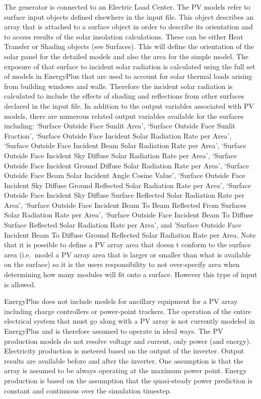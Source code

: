 The generator is connected to an Electric Load Center. The PV models refer to surface input objects defined elsewhere in the input file. This object describes an array that is attached to a surface object in order to describe its orientation and to access results of the solar insolation calculations. These can be either Heat Transfer or Shading objects (see Surfaces). This will define the orientation of the solar panel for the detailed models and also the area for the simple model. The exposure of that surface to incident solar radiation is calculated using the full set of models in EnergyPlus that are used to account for solar thermal loads arising from building windows and walls. Therefore the incident solar radiation is calculated to include the effects of shading and reflections from other surfaces declared in the input file. In addition to the output variables associated with PV models, there are numerous related output variables available for the surfaces including: `Surface Outside Face Sunlit Area', `Surface Outside Face Sunlit Fraction', `Surface Outside Face Incident Solar Radiation Rate per Area', `Surface Outside Face Incident Beam Solar Radiation Rate per Area', `Surface Outside Face Incident Sky Diffuse Solar Radiation Rate per Area', `Surface Outside Face Incident Ground Diffuse Solar Radiation Rate per Area', `Surface Outside Face Beam Solar Incident Angle Cosine Value', `Surface Outside Face Incident Sky Diffuse Ground Reflected Solar Radiation Rate per Area', `Surface Outside Face Incident Sky Diffuse Surface Reflected Solar Radiation Rate per Area', `Surface Outside Face Incident Beam To Beam Reflected From Surfaces Solar Radiation Rate per Area', `Surface Outside Face Incident Beam To Diffuse Surface Reflected Solar Radiation Rate per Area', and 'Surface Outside Face Incident Beam To Diffuse Ground Reflected Solar Radiation Rate per Area. Note that it is possible to define a PV array area that doesn t conform to the surface area (i.e.~model a PV array area that is larger or smaller than what is available on the surface) so it is the users responsibility to not over-specify area when determining how many modules will fit onto a surface. However this type of input is allowed.

EnergyPlus does not include models for ancillary equipment for a PV array including charge controllers or power-point trackers. The operation of the entire electrical system that must go along with a PV array is not currently modeled in EnergyPlus and is therefore assumed to operate in ideal ways. The PV production models do not resolve voltage and current, only power (and energy). Electricity production is metered based on the output of the inverter. Output results are available before and after the inverter. One assumption is that the array is assumed to be always operating at the maximum power point. Energy production is based on the assumption that the quasi-steady power prediction is constant and continuous over the simulation timestep.


